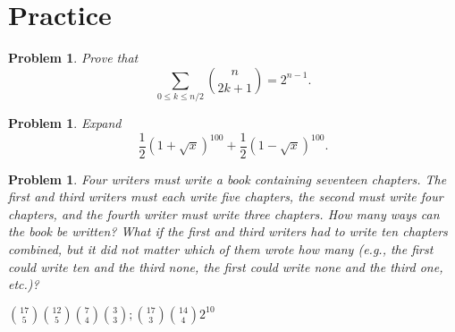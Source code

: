 \documentclass[11pt, openany]{book}
\theoremstyle{change} \theoremheaderfont{\blue\sffamily\bfseries}
\newtheorem{pro}[thm]{Problem}
\theoremstyle{nonumberplain} \theoremheaderfont{\sffamily\bfseries}
\def\binom#1#2{{#1\choose#2}}
\newcommand{\í}{\'{\i}}
\begin{document}
\section*{Practice}\begin{multicols}{2}\columnseprule 1pt \columnsep 25pt

\begin{pro} Prove that $$ \sum _{0 \leq k \leq n/2} \binom{n}{2k + 1} =
2^{n - 1}.$$\end{pro}
\begin{pro} Expand $$ \frac{1}{2}(1 + \sqrt{x})^{100} + \frac{1}{2}(1 - \sqrt{x})^{100}.$$\end{pro}

\begin{pro}

Four writers must write a book containing seventeen chapters. The
first and third writers must each write five chapters, the second
must write four chapters, and the fourth writer must write three
chapters. How many ways can the book be written? What if the first
and third writers had to write ten chapters combined, but it did
not matter which of them wrote how many (e.g., the first could
write ten and the third none, the first could write none and the
third one, etc.)?
\begin{answer}
$\binom{17}{5}\binom{12}{5}\binom{7}{4}\binom{3}{3};
\binom{17}{3}\binom{14}{4}2^{10}$
\end{answer}
\end{pro}


\end{multicols}
\end{document}
